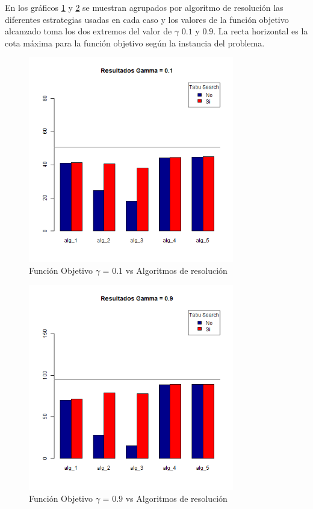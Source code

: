 En los gráficos \ref{res:img-papers-agr-gamma01} y \ref{res:img-papers-agr-gamma09} se muestran agrupados por algoritmo de resolución las diferentes estrategias usadas en cada caso y los valores de la función objetivo alcanzado toma los dos extremos del valor de $\gamma$ $0.1$ y $0.9$. La recta horizontal es la cota máxima para la función objetivo según la instancia del problema.

\begin{figure}[H]
  \centering
    \includegraphics[width=0.8\textwidth]{resultados/papers/Graficos_agrupados/gamma01.png}
  \caption{Función Objetivo $\gamma$ = $0.1$ vs Algoritmos de resolución}
  \label{res:img-papers-agr-gamma01}
\end{figure}

\begin{figure}[H]
  \centering
    \includegraphics[width=0.8\textwidth]{resultados/papers/Graficos_agrupados/gamma09.png}
  \caption{Función Objetivo $\gamma$ = $0.9$ vs Algoritmos de resolución}
  \label{res:img-papers-agr-gamma09}
\end{figure}

